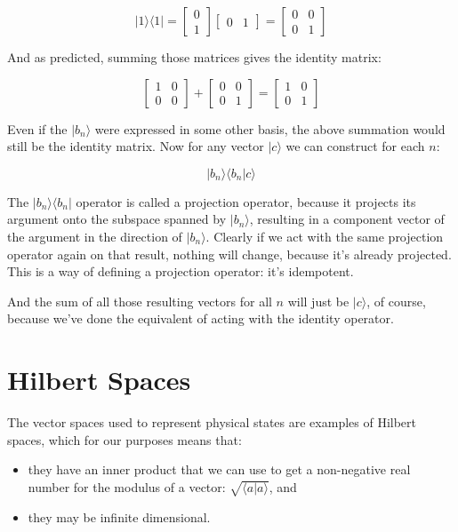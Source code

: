 $$
|1 \rangle \langle 1| = 
\begin{bmatrix} 0 \\ 1 \end{bmatrix}
\begin{bmatrix} 0 & 1 \end{bmatrix} =
\begin{bmatrix} 0 & 0 \\ 0 & 1 \end{bmatrix}
$$

And as predicted, summing those matrices gives the identity matrix:

$$
\begin{bmatrix} 1 & 0 \\ 0 & 0 \end{bmatrix} +
\begin{bmatrix} 0 & 0 \\ 0 & 1 \end{bmatrix} =
\begin{bmatrix} 1 & 0 \\ 0 & 1 \end{bmatrix}
$$

Even if the $|b_n \rangle$ were expressed in some other basis, the above summation would still be the identity matrix. Now for any vector $|c \rangle$ we can construct for each $n$:

$$|b_n \rangle \langle b_n | c \rangle$$

The $|b_n \rangle \langle b_n|$ operator is called a projection operator, because it projects its argument onto the subspace spanned by $|b_n \rangle$, resulting in a component vector of the argument in the direction of $|b_n \rangle$. Clearly if we act with the same projection operator again on that result, nothing will change, because it's already projected. This is a way of defining a projection operator: it's idempotent.

And the sum of all those resulting vectors for all $n$ will just be $|c \rangle$, of course, because we've done the equivalent of acting with the identity operator.

\section{Hilbert Spaces}

The vector spaces used to represent physical states are examples of Hilbert spaces, which for our purposes means that:

\begin{itemize}
  \item they have an inner product that we can use to get a non-negative real number for the modulus of a vector: $\sqrt{\langle a|a \rangle}$, and 
  \item they may be infinite dimensional.
\end{itemize}

